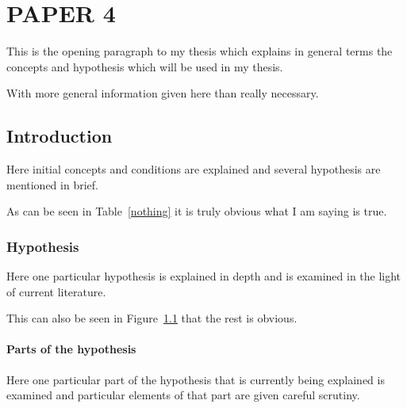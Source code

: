 \chapter{PAPER 4}

This is the opening paragraph to my thesis which
explains in general terms the concepts and hypothesis
which will be used in my thesis.

With more general information given here than really
necessary.

\section{Introduction}

Here initial concepts and conditions are explained and
several hypothesis are mentioned in brief.

As can be seen in Table~\ref{nothing} it is truly
obvious what I am saying is true.

\begin{table}[h!tb] \centering
{}
\label{nothing}

\vspace{ 2 in}
\end{table}

\subsection{Hypothesis}

Here one particular hypothesis is explained in depth
and is examined in the light of current literature.

This can also be seen in Figure~\ref{moon} that the
rest is obvious.

\begin{figure}[h!tb] \centering

\vspace{ 2 in}
\label{moon}
\end{figure}

\subsubsection{Parts of the hypothesis}

Here one particular part of the hypothesis that is 
currently being explained is examined and particular
elements of that part are given careful scrutiny.

